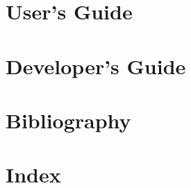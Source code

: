 \documentclass[
paper=a4,                       %
fontsize=11pt,                  %
twoside,                        %
footsepline,                    %
headsepline,                    %
headinclude=false,              %
footinclude=false,              %
pagesize,                       %
bibliography=totocnumbered,     %
toc=index,                    %
open=right,                      %
]{scrreprt}
\begin{document}
\listoftodos
{}

\part{User's Guide}



 












\part{Developer's Guide}






\part{Bibliography}



\part{Index}
\cleardoublepage
{}
\listoftables
\cleardoublepage
{}
\listoffigures
\cleardoublepage
\printindex
\end{document}
